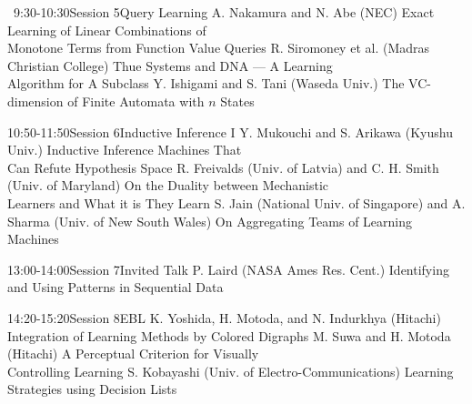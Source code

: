 

\vspace{5mm}


\begin{session}{~9:30-10:30}{Session 5}{Query Learning}
\talk
{A. Nakamura and N. Abe (NEC)}
{Exact Learning of Linear Combinations of \\ Monotone Terms from Function Value Queries}
\talk
{R. Siromoney et al. (Madras Christian College)}
{Thue Systems and DNA --- A Learning \\ Algorithm for A Subclass}
\talk
{Y. Ishigami and S. Tani (Waseda Univ.)}
{The VC-dimension of Finite Automata with $n$ States}
\end{session}


\begin{session}{10:50-11:50}{Session 6}{Inductive Inference I}
\talk
{Y. Mukouchi and S. Arikawa (Kyushu Univ.)}
{Inductive Inference Machines That \\
 Can Refute Hypothesis Space}
\talk
{R. Freivalds (Univ. of Latvia) and C. H. Smith (Univ. of Maryland)}
{On the Duality between Mechanistic \\
 Learners and What it is They Learn}
\talk
{S. Jain (National Univ. of Singapore) and A. Sharma (Univ. of New South Wales)}
{On Aggregating Teams of Learning Machines}
\end{session}


\begin{session}{13:00-14:00}{Session 7}{Invited Talk}
\talk
{P. Laird  (NASA Ames Res. Cent.)}
{Identifying and Using Patterns in Sequential Data}
\end{session}


\begin{session}{14:20-15:20}{Session 8}{EBL}
\talk
{K. Yoshida, H. Motoda, and N. Indurkhya (Hitachi)}
{Integration of Learning Methods by Colored Digraphs}
\talk
{M. Suwa and H. Motoda (Hitachi)}
{A Perceptual Criterion for Visually \\ Controlling Learning}
\talk
{S. Kobayashi (Univ. of Electro-Communications)}
{Learning Strategies using Decision Lists}
\end{session}

